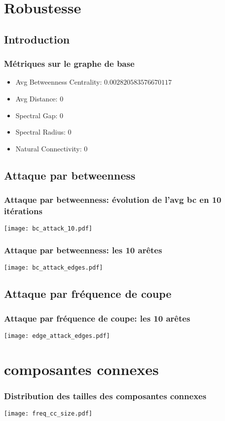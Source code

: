 \documentclass[aspectratio=169]{beamer}
\begin{document}
    \section{Robustesse}
    \subsection{Introduction}
    \begin{frame}
        \frametitle{Métriques sur le graphe de base}
        \begin{itemize}
            \item Avg Betweenness Centrality: $0.002820583576670117$
            \item Avg Distance: $0$
            \item Spectral Gap: $0$
            \item Spectral Radius: $0$
            \item Natural Connectivity: $0$
        \end{itemize}
    \end{frame}

    
        
    

    \subsection{Attaque par betweenness}
    \begin{frame}
        \frametitle{Attaque par betweenness: évolution de l'avg bc en 10 itérations}
        \centering
        \texttt{[image: bc\_attack\_10.pdf]}
    \end{frame}

    \begin{frame}
        \frametitle{Attaque par betweenness: les 10 arêtes}
        \centering
        \texttt{[image: bc\_attack\_edges.pdf]}
    \end{frame}

    \subsection{Attaque par fréquence de coupe}
    \begin{frame}
        \frametitle{Attaque par fréquence de coupe: les 10 arêtes}
        \centering
        \texttt{[image: edge\_attack\_edges.pdf]}
    \end{frame}

    \section{composantes connexes}
    \begin{frame}
        \frametitle{Distribution des tailles des composantes connexes}
        \centering
        \texttt{[image: freq\_cc\_size.pdf]}
    \end{frame}
\end{document}
